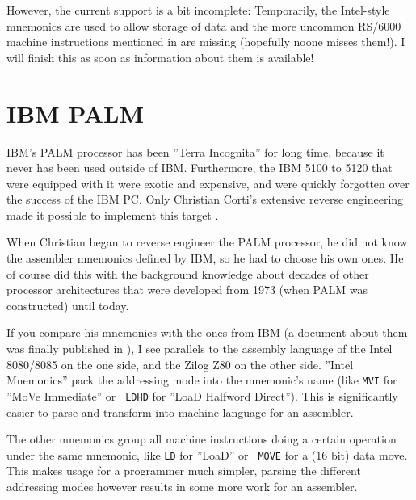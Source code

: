 \documentclass[12pt,twoside]{report}
\begin{document}
However, the current support is a bit incomplete: Temporarily, the
Intel-style mnemonics are used to allow storage of data and the more
uncommon RS/6000 machine instructions mentioned in \cite{Mot601} are
missing (hopefully noone misses them!).  I will finish this as soon
as information about them is available!


\section{IBM PALM}

IBM's PALM processor has been ''Terra Incognita'' for long time, because
it never has been used outside of IBM.  Furthermore, the IBM 5100 to
5120 that were equipped with it were exotic and expensive, and were
quickly forgotten over the success of the IBM PC.  Only Christian
Corti's extensive reverse engineering made it possible to implement
this target \cite{CortPalm}.

When Christian began to reverse engineer the PALM processor, he did
not know the assembler mnemonics defined by IBM, so he had to choose
his own ones.  He of course did this with the background knowledge about
decades of other processor architectures that were developed from 1973
(when PALM was constructed) until today.

If you compare his mnemonics with the ones from IBM (a document about
them was finally published in \cite{IBMPalm}), I see parallels to the
assembly language of the Intel 8080/8085 on the one side, and the Zilog
Z80 on the other side.  ''Intel Mnemonics'' pack the addressing mode
into the mnemonic's name (like {\tt MVI} for ''MoVe Immediate'' or {\tt
LDHD} for ''LoaD Halfword Direct'').  This is significantly easier to
parse and transform into machine language for an assembler.

The other mnemonics group all machine instructions doing a certain
operation under the same mnemonic, like {\tt LD} for ''LoaD'' or {\tt
MOVE} for a (16 bit) data move.  This makes usage for a programmer much
simpler, parsing the different addressing modes however results in some
more work for an assembler.
\end{document}
